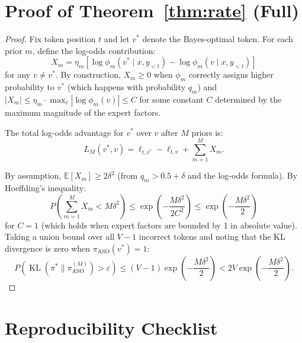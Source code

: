 \documentclass[11pt]{article}
\DeclareMathOperator{\KL}{KL}
\begin{document}
\section{Proof of Theorem~\ref{thm:rate} (Full)}
\label{app:proof-rate}

\begin{proof}
Fix token position $t$ and let $v^*$ denote the Bayes-optimal token. For each
prior $m$, define the log-odds contribution:
\begin{equation}
    X_m = \eta_m \left[\log \phi_m(v^* \mid x, y_{<t}) - \log \phi_m(v \mid x, y_{<t})\right]
\end{equation}
for any $v \neq v^*$. By construction, $X_m \geq 0$ when $\phi_m$ correctly
assigns higher probability to $v^*$ (which happens with probability $q_m$) and
$|X_m| \leq \eta_m \cdot \max_v |\log \phi_m(v)| \leq C$ for some constant $C$
determined by the maximum magnitude of the expert factors.

The total log-odds advantage for $v^*$ over $v$ after $M$ priors is:
\begin{equation}
    L_M(v^*, v) = \ell_{t,v^*} - \ell_{t,v} + \sum_{m=1}^M X_m.
\end{equation}

By assumption, $\mathbb{E}[X_m] \geq 2\delta^2$ (from $q_m > 0.5 + \delta$
and the log-odds formula). By Hoeffding's inequality:
\begin{equation}
    P\left(\sum_{m=1}^M X_m < M\delta^2\right)
    \leq \exp\left(-\frac{M\delta^2}{2C^2}\right)
    \leq \exp\left(-\frac{M\delta^2}{2}\right)
\end{equation}
for $C = 1$ (which holds when expert factors are bounded by 1 in absolute
value). Taking a union bound over all $V - 1$ incorrect tokens and noting
that the KL divergence is zero when $\pi_{\text{ASO}}(v^*) = 1$:
\begin{equation}
    P\left(\KL(\pi^* \| \pi_{\text{ASO}}^{(M)}) > \varepsilon\right)
    \leq (V-1) \exp\left(-\frac{M\delta^2}{2}\right)
    < 2V \exp\left(-\frac{M\delta^2}{2}\right).
\end{equation}
\end{proof}

\section{Reproducibility Checklist}
\label{app:reproducibility}
\end{document}
